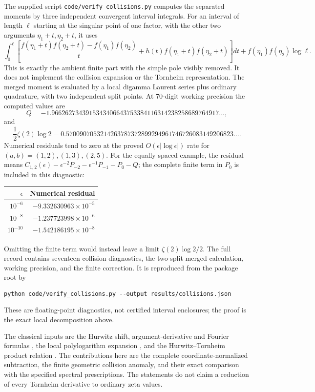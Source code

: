 \documentclass[11pt,a4paper]{article}
\numberwithin{equation}{section}
\theoremstyle{definition}
\theoremstyle{remark}
\newcommand{\src}[1]{\nolinkurl{#1}}
\begin{document}
The supplied script \src{code/verify_collisions.py} computes the
separated moments by three independent convergent interval integrals.
For an interval of length $\ell$ starting at the singular point of one
factor, with the other two arguments $\eta_1+t,\eta_2+t$, it uses
\[
 \int_0^\ell\left[
 \frac{f(\eta_1+t)f(\eta_2+t)-f(\eta_1)f(\eta_2)}{t}
 +h(t)f(\eta_1+t)f(\eta_2+t)\right]dt
 +f(\eta_1)f(\eta_2)\log\ell.
\]
This is exactly the ambient finite part with the simple pole visibly
removed. It does not implement the collision expansion or the
Tornheim representation. The merged moment is evaluated by a local
digamma Laurent series plus ordinary quadrature, with two independent
split points. At 70-digit working precision the computed values are
\[
 Q=-1.9662627343915343406643753384116314238258689764917\ldots,
\]
and
\[
 \frac12\zeta(2)\log2=0.5700907053214263787372899294961746726083149206823\ldots.
\]
Numerical residuals tend to zero at the proved
$O(\epsilon|\log\epsilon|)$ rate for $(a,b)=(1,2),(1,3),(2,5)$.
For the equally spaced example, the residual means
$C_{1,2}(\epsilon)-\epsilon^{-2}P_{-2}
 -\epsilon^{-1}P_{-1}-P_0-Q$; the complete finite term in $P_0$
is included in this diagnostic:
\begin{center}
\begin{tabular}{@{}rr@{}}
\toprule
$\epsilon$ & Numerical residual\\
\midrule
$10^{-6}$ & $-9.332630963\times10^{-5}$\\
$10^{-8}$ & $-1.237723998\times10^{-6}$\\
$10^{-10}$ & $-1.542186195\times10^{-8}$\\
\bottomrule
\end{tabular}
\end{center}
Omitting the finite term would instead leave a limit
$\zeta(2)\log2/2$. The full record contains seventeen collision
diagnostics, the two-split merged calculation, working precision,
and the finite correction. It is reproduced from the package root by
\begin{verbatim}
python code/verify_collisions.py --output results/collisions.json
\end{verbatim}
These are floating-point diagnostics, not certified interval enclosures;
the proof is the exact local decomposition above.

The classical inputs are the Hurwitz shift, argument-derivative and
Fourier formulas \cite{DLMFHurwitz}, the local polylogarithm expansion
\cite{DLMFPolylog}, and the Hurwitz--Tornheim product relation
\cite{EspinosaMoll}. The contributions here are the complete
coordinate-normalized subtraction, the finite geometric collision
anomaly, and their exact comparison with the specified spectral
prescriptions. The statements do not claim a reduction of every
Tornheim derivative to ordinary zeta values.
\end{document}

